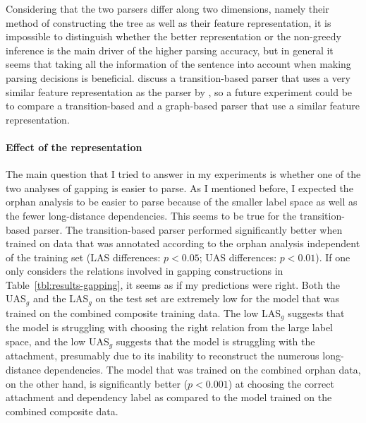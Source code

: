 \documentclass[lucida,biblatex]{sp} %
\begin{document}
Considering that the two parsers differ along two dimensions, namely their method of constructing the tree as well as their feature representation, it is impossible to distinguish whether the better representation or the non-greedy inference is the main driver of the higher parsing accuracy, but in general it seems that taking all the information of the sentence into account when making parsing decisions is beneficial. \textcite{Kiperwasser2016} discuss a transition-based parser that uses a very similar feature representation as the parser by \textcite{Dozat2017}, so a future experiment could be to compare a transition-based and a graph-based parser that use a similar feature representation.

\paragraph{Effect of the representation}

The main question that I tried to answer in my experiments is whether one of the two analyses of gapping is easier to parse. As I mentioned before, I expected the {\sc orphan} analysis to be easier to parse because of the smaller label space as well as the fewer long-distance dependencies. This seems to be true for the transition-based parser. The transition-based parser  performed significantly better when trained on data that was annotated according to the {\sc orphan} analysis independent of the training set (LAS differences: $p<0.05$; UAS differences: $p<0.01$). If one only considers the relations involved in gapping constructions in Table~\ref{tbl:results-gapping}, it seems as if my predictions were right. Both  the UAS$_g$ and the LAS$_g$ on the test set are extremely low for the model that was trained on the {\sc combined composite} training data. The low LAS$_g$ suggests that the model is struggling with choosing the right relation from the large label space, and the low UAS$_g$ suggests that the model is struggling with the attachment, presumably due to its inability to reconstruct the numerous long-distance dependencies. The model that was trained on the {\sc combined orphan} data, on the other hand, is significantly better ($p<0.001$) at choosing the correct attachment and dependency label as compared to the model trained on the {\sc combined composite} data.
\end{document}
